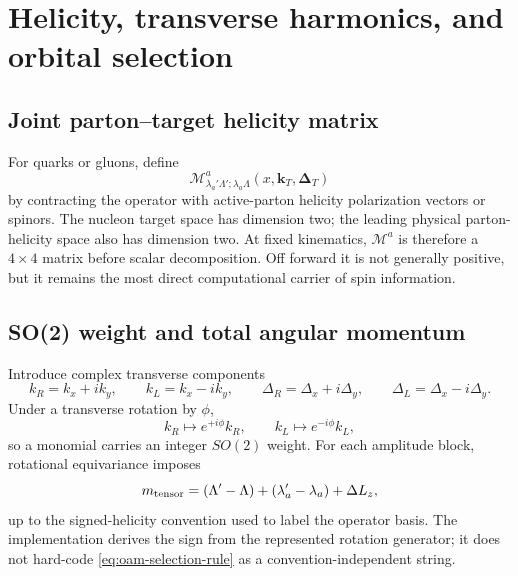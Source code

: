 \documentclass[11pt]{article}
\newcommand{\kT}{\bm{k}_{T}}
\newcommand{\DT}{\bm{\Delta}_{T}}
\newcommand{\cM}{\mathcal M}
\begin{document}
\section{Helicity, transverse harmonics, and orbital selection}
\label{sec:helicity-oam}

\subsection{Joint parton--target helicity matrix}

For quarks or gluons, define
\begin{equation}
 \cM^a_{\lambda_a'\Lambda';\lambda_a\Lambda}
 (x,\kT,\DT)
\label{eq:joint-helicity-matrix}
\end{equation}
by contracting the operator with active-parton helicity polarization vectors
or spinors.  The nucleon target space has dimension two; the leading physical
parton-helicity space also has dimension two.  At fixed kinematics,
\(\cM^a\) is therefore a \(4\times4\) matrix before scalar decomposition.
Off forward it is not generally positive, but it remains the most direct
computational carrier of spin information.

\subsection{SO(2) weight and total angular momentum}

Introduce complex transverse components
\begin{equation}
 k_R=k_x+ik_y,
 \qquad
 k_L=k_x-ik_y,
 \qquad
 \Delta_R=\Delta_x+i\Delta_y,
 \qquad
 \Delta_L=\Delta_x-i\Delta_y.
\label{eq:complex-transverse}
\end{equation}
Under a transverse rotation by \(\phi\),
\begin{equation}
 k_R\mapsto e^{+i\phi}k_R,
 \qquad
 k_L\mapsto e^{-i\phi}k_L,
\label{eq:so2-weight}
\end{equation}
so a monomial carries an integer \(SO(2)\) weight.  For each amplitude block,
rotational equivariance imposes
\begin{equation}
 m_{\rm tensor}
 =\left(\Lambda'-\Lambda\right)
  +\left(\lambda_a'-\lambda_a\right)
  +\Delta L_z,
\label{eq:oam-selection-rule}
\end{equation}
up to the signed-helicity convention used to label the operator basis.  The
implementation derives the sign from the represented rotation generator; it
does not hard-code \cref{eq:oam-selection-rule} as a convention-independent
string.
\end{document}
